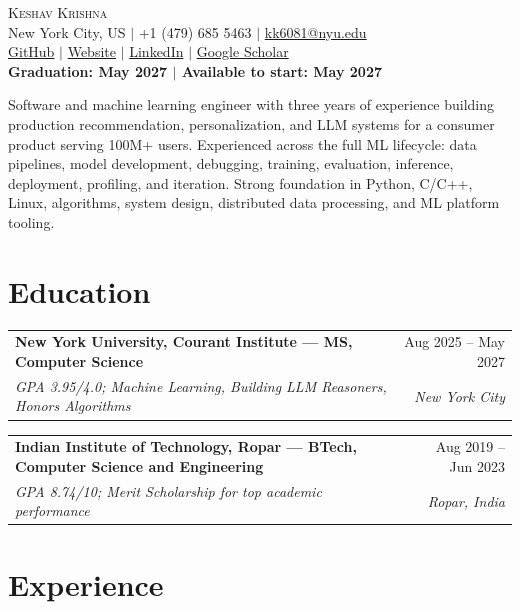 \documentclass[10pt,letterpaper]{article}
\makeatletter
\newcommand{\entry}[4]{%
  \begin{tabularx}{\textwidth}{@{}Xr@{}}
    \textbf{#1} & #2 \\
    \textit{#3} & \textit{#4}
  \end{tabularx}\vspace{-0.2em}
}
\makeatother
\begin{document}
\fontsize{10.1}{12.7}\selectfont

\begin{center}
  {\fontsize{24}{27}\selectfont\scshape Keshav Krishna}\\[0.12em]
  New York City, US $\mid$ +1 (479) 685 5463 $\mid$ \href{mailto:kk6081@nyu.edu}{kk6081@nyu.edu}\\[-0.05em]
  \href{https://github.com/k-keshav-k}{GitHub} $\mid$
  \href{https://k-keshav-k.github.io/}{Website} $\mid$
  \href{https://www.linkedin.com/in/keshav-krishna-5054681a9/}{LinkedIn} $\mid$
  \href{https://scholar.google.com/citations?user=zN7P_v4AAAAJ}{Google Scholar}\\[0.08em]
  \textbf{Graduation: May 2027 $\mid$ Available to start: May 2027}
\end{center}

\vspace{0.25em}
Software and machine learning engineer with three years of experience building production recommendation, personalization, and LLM systems for a consumer product serving 100M+ users. Experienced across the full ML lifecycle: data pipelines, model development, debugging, training, evaluation, inference, deployment, profiling, and iteration. Strong foundation in Python, C/C++, Linux, algorithms, system design, distributed data processing, and ML platform tooling.

\section{Education}

\entry{New York University, Courant Institute --- MS, Computer Science}{Aug 2025 -- May 2027}{GPA 3.95/4.0; Machine Learning, Building LLM Reasoners, Honors Algorithms}{New York City}

\vspace{0.4em}
\entry{Indian Institute of Technology, Ropar --- BTech, Computer Science and Engineering}{Aug 2019 -- Jun 2023}{GPA 8.74/10; Merit Scholarship for top academic performance}{Ropar, India}

\section{Experience}
\end{document}
